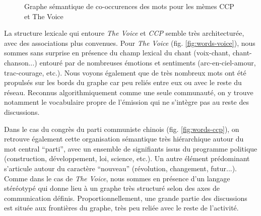 \begin{figure}[htbp]
    \centering
    
  \caption{
    Graphe sémantique de co-occurences des mots pour les mèmes CCP et The Voice
  }
\end{figure}

 La structure lexicale qui entoure \textit{The Voice }et \textit{CCP }semble très architecturée, avec des associations plus convenues. Pour \textit{The Voice} (fig. \ref{fig:words-voice}), nous sommes sans surprise en présence du champ lexical du chant (voix-chant, chant-chanson...) entouré par de nombreuses émotions et sentiments (arc-en-ciel-amour, trac-courage, etc.). Nous voyons également que de très nombreux mots ont été propulsés sur les bords du graphe car peu reliés entre eux ou avec le reste du réseau. Reconnus algorithmiquement comme une seule communauté, on y trouve notamment le vocabulaire propre de l{\textquoteright}émission qui ne s'intègre pas au reste des discussions. 

Dans le cas du congrès du parti communiste chinois (fig. \ref{fig:words-ccp}), on retrouve également cette organisation sémantique très hiérarchique autour du mot central {\textquotedblleft}parti{\textquotedblright}, avec un ensemble de signifiants issus du programme politique (construction, développement, loi, science, etc.). Un autre élément prédominant s{\textquoteright}articule autour du caractère {\textquotedblleft}nouveau{\textquotedblright} (révolution, changement, futur...). Comme dans le cas de \textit{The Voice}, nous sommes en présence d{\textquoteright}un langage stéréotypé qui donne lieu \`a un graphe très structuré selon des axes de communication définis. Proportionnellement, une grande partie des discussions est située aux frontières du graphe, très peu reliée avec le reste de l{\textquoteright}activité.

